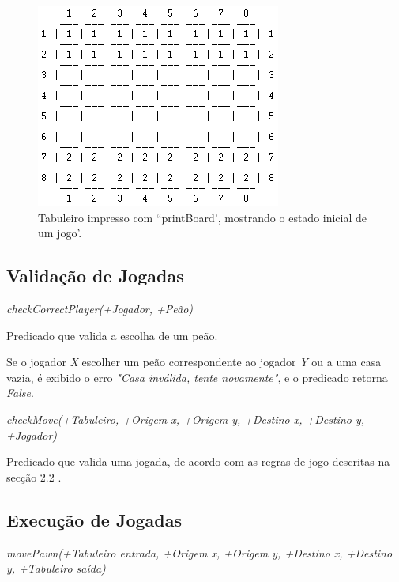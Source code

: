 \documentclass[15pt,a4paper]{article}
\begin{document}
\begin{figure}[h!]
\begin{center}
\includegraphics[scale=1]{fig_tab.png}
\caption{Tabuleiro impresso com ``printBoard', mostrando o estado inicial de um jogo'.}
\label{fig:3}
\end{center}
\end{figure}

\newpage


\subsection{Validação de Jogadas}
 \textit{checkCorrectPlayer(+Jogador, +Peão)}

Predicado que valida a escolha de um peão.

Se o jogador \textit{X} escolher um peão correspondente ao jogador \textit{Y} ou a uma casa vazia, é exibido o erro \textit{"Casa inválida, tente novamente"}, e o predicado retorna \textit{False}.

\textit{ checkMove(+Tabuleiro, +Origem x, +Origem y, +Destino x, +Destino y, +Jogador) }

Predicado que valida uma jogada, de acordo com as regras de jogo descritas na secção 2.2 .


\subsection{Execução de Jogadas}

\textit{movePawn(+Tabuleiro entrada, +Origem x, +Origem y, +Destino x, +Destino y, +Tabuleiro saída)}
\end{document}
